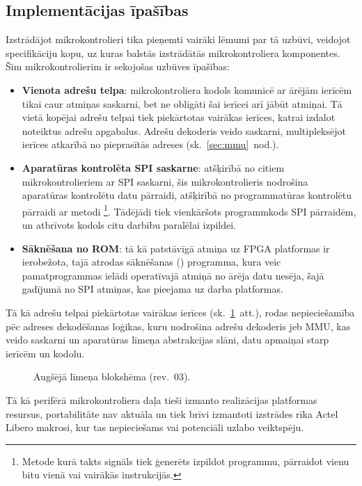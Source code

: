 \subsection{Implementācijas īpašības} \label{sec:design}
Izstrādājot mikrokontrolieri tika pieņemti vairāki lēmumi par tā uzbūvi,
veidojot specifikāciju kopu, uz kuras
balstās izstrādātās mikrokontroliera komponentes.
Šim mikrokontrolierim ir sekojošas uzbūves īpašības:
\begin{itemize}
	\item \textbf{Vienota adrešu telpa}:
		mikrokontroliera kodols komunicē ar ārējām ierīcēm tikai caur
		atmiņas saskarni, bet ne obligāti šai ierīcei arī jābūt atmiņai.
		Tā vietā kopējai adrešu telpai tiek piekārtotas vairākas ierīces,
		katrai izdalot noteiktus adrešu apgabalus. Adrešu dekoderis veido saskarni,
		multipleksējot ierīces atkarībā no pieprasītās adreses
		(sk.~\ref{sec:mmu}~nod.).\pagebreak[1]
	\item \textbf{Aparatūras kontrolēta SPI saskarne}:
		atšķirībā no citiem mikrokontrolieriem ar SPI saskarni,
		šis mikro\-kontrolieris nodrošina aparatūras kontrolētu datu pārraidi,
		atšķirībā no programmatūras kontrolētu pārraidi ar
		 metodi%
		\footnote{Metode kurā takts signāls tiek ģenerēts izpildot programmu,
			pārraidot vienu bitu vienā vai vairākās instrukcijās.}.
		Tādējādi tiek vienkāršots programmkods SPI pārraidēm, un atbrīvots
		kodols citu darbību paralēlai izpildei.
	\item \textbf{Sāknēšana no ROM}:
		tā kā patstāvīgā atmiņa uz FPGA platformas ir ierobežota, tajā
		atrodas sāknēšanas () programma,
		kura veic pamatprogrammas ielādi
		operatīvajā atmiņā no ārēja datu nesēja, šajā gadījumā no 
		SPI  atmiņas, kas pieejama uz darba platformas.
\end{itemize}

Tā kā adrešu telpai piekārtotas vairākas ierīces (sk.~\ref{fig:top-rev3}~att.),
rodas nepieciešamība pēc adreses dekodēšanas loģikas, kuru nodrošina
adrešu dekoderis jeb MMU, kas veido saskarni un 
aparatūras līmeņa abstrakcijas slāni, datu apmaiņai starp ierīcēm un kodolu.

\begin{figure}[tbhp]
	\centering
	\def\svgwidth{\textwidth}
	{}
	\caption{Augšējā līmeņa blokshēma (rev.~03).}
	\label{fig:top-rev3}
\end{figure}

Tā kā perifērā mikrokontroliera daļa tieši izmanto realizācijas
platformas resursus, portabilitāte nav aktuāla un tiek brīvi izmantoti izstrādes rīka 
Actel Libero makrosi, kur tas nepieciešams vai potenciāli uzlabo
veiktspēju.
\FloatBarrier %
